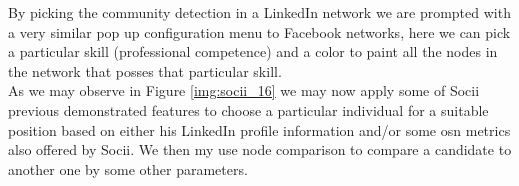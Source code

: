 \indent By picking the community detection in a LinkedIn network we are prompted with a very similar pop up configuration menu to Facebook networks, here we can pick a particular skill (professional competence) and a color to paint all the nodes in the network that posses that particular skill.\\
\indent As we may observe in Figure \ref{img:socii_16} we may now apply some of Socii previous demonstrated features to choose a particular individual for a suitable position based on either his LinkedIn profile information and/or some \gls{osn} metrics also offered by Socii. We then my use node comparison to compare a candidate to another one by some other parameters.
